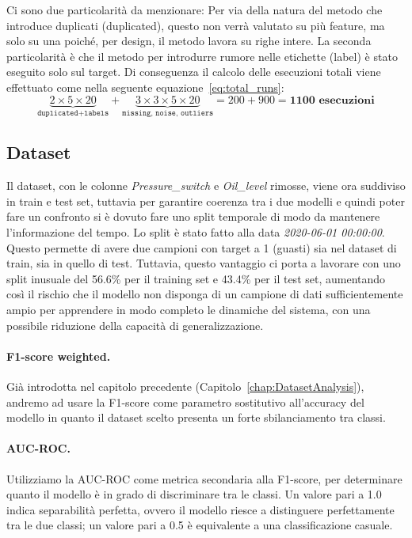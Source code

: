 \documentclass[../main.tex]{subfiles}
\begin{document}
Ci sono due particolarità da menzionare: Per via della natura del metodo che introduce duplicati (duplicated), questo non verrà valutato su più feature, ma solo su una poiché, per design, il metodo lavora su righe intere.
La seconda particolarità è che il metodo per introdurre rumore nelle etichette (label) è stato eseguito solo sul target. Di conseguenza il calcolo delle esecuzioni totali viene effettuato come nella seguente equazione~\ref{eq:total_runs}:
\begin{equation}
  \underbrace{2 \times 5 \times 20}_{\texttt{duplicated} + \texttt{labels}}
  +
  \underbrace{3 \times 3 \times 5 \times 20}_{\texttt{missing},\, \texttt{noise},\, \texttt{outliers}}
  = 200 + 900 = \mathbf{1100 \text{ esecuzioni}}
  \label{eq:total_runs}
\end{equation}

\subsection{Dataset}
\label{subsection:datasetSplit}
Il dataset, con le colonne \textit{Pressure\_switch} e \textit{Oil\_level} rimosse, viene ora suddiviso in train e test set, tuttavia per garantire coerenza tra i due modelli e quindi poter fare un confronto si è dovuto fare uno split temporale di modo da mantenere l'informazione del tempo. Lo split è stato fatto alla data \textit{2020-06-01 00:00:00}. Questo permette di avere due campioni con target a 1 (guasti) sia nel dataset di train, sia in quello di test. Tuttavia, questo vantaggio ci porta a lavorare con uno split inusuale del 56.6\% per il training set e 43.4\% per il test set, aumentando così il rischio che il modello non disponga di un campione di dati sufficientemente ampio per apprendere in modo completo le dinamiche del sistema, con una possibile riduzione della capacità di generalizzazione.

\paragraph{F1-score weighted.}
Già introdotta nel capitolo precedente (Capitolo~\ref{chap:DatasetAnalysis}), andremo ad usare la F1-score come parametro sostitutivo all'accuracy del modello in quanto il dataset scelto \cite{MetroDT} presenta un forte sbilanciamento tra classi.

\paragraph{AUC-ROC.}
Utilizziamo la AUC-ROC come metrica secondaria alla F1-score, per determinare quanto il modello è in grado di discriminare tra le classi. Un valore pari a 1.0 indica separabilità perfetta, ovvero il modello riesce a distinguere perfettamente tra le due classi; un valore pari a 0.5 è equivalente a una classificazione casuale.
\end{document}
